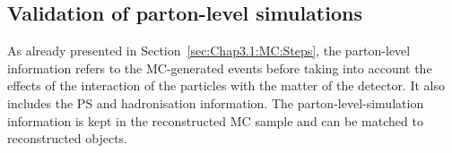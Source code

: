 


\subsection{Validation of parton-level simulations}
\label{sec:ChaptH:Sig:truth}
As already presented in Section~\ref{sec:Chap3.1:MC:Steps}, the parton-level 
information refers to the MC-generated events before taking into account
the effects of the interaction of the particles with the matter of the detector. It also includes
the PS and hadronisation information. The parton-level-simulation information is kept in the 
reconstructed MC sample and can be matched to reconstructed objects.

